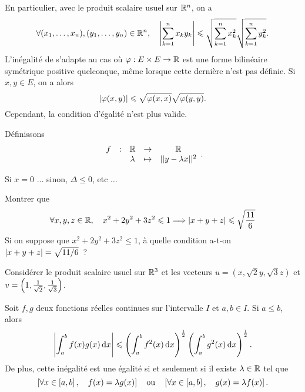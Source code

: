 \documentclass{magnolia}
\begin{document}
\begin{remarques}
\remarque En particulier, avec le produit scalaire usuel sur $\mathbb{R}^n$, on a
  \[\forall (x_1,\ldots,x_n),(y_1,\ldots,y_n)\in\mathbb{R}^n,\quad
    \left|\sum_{k=1}^n x_k y_k\right| \leqslant \sqrt{\sum_{k=1}^n x_k^2}\sqrt{\sum_{k=1}^n y_k^2}.\]
\remarque L'inégalité de  s'adapte au cas où $\varphi:E\times E\to\mathbb{R}$
  est une forme bilinéaire symétrique positive quelconque, même lorsque cette
  dernière n'est pas définie. Si $x,y\in E$, on a alors
  \[\left|\varphi(x,y)\right|\leqslant\sqrt{\varphi(x,x)}\sqrt{\varphi(y,y)}.\]
  Cependant, la condition d'égalité n'est plus valide.
\end{remarques}


\begin{preuve}
Définissons $$\begin{array}{ccccc}
f & : & \mathbb{R} & \to & \mathbb{R} \\
 & & \lambda & \mapsto & ||y-\lambda x||^2 
\end{array}.$$

Si $x=0$ $\ldots$ sinon, $\Delta\le 0$, etc $\ldots$
\end{preuve}

\begin{exoUnique}
\exo Montrer que
  \[\forall x,y,z\in\mathbb{R} ,\quad x^2+2y^2+3z^2\leqslant 1 \Longrightarrow
    \left|x+y+z\right|\leqslant\sqrt{\frac{11}{6}}\]
  Si on suppose que $x^2+2y^2+3z^2\leq 1$, à quelle condition a-t-on
  $\left|x+y+z\right|=\sqrt{11/6}$~?
  \begin{sol}
  Considérer le produit scalaire usuel sur $\mathbb{R}^3$ et les vecteurs
  $u=(x,\sqrt{2}y,\sqrt{3}z)$ et $v=\left(1,\frac{1}{\sqrt{2}},\frac{1}{\sqrt{3}}\right)$.
  \end{sol}
\end{exoUnique}

\begin{proposition}[utile=3, nom=Inégalité de \nom{Cauchy-Schwarz}]
Soit $f,g$ deux fonctions réelles continues sur l'intervalle $I$
et $a,b\in I$. Si $a\leq b$, alors
\[\left|\int_{a}^{b} f(x)g(x)\,\text{d}x\right|\leqslant
  \left(\int_{a}^{b} f^2(x)\,\text{d}x\right)^{\frac{1}{2}}
  \left(\int_{a}^{b} g^2(x)\,\text{d}x\right)^{\frac{1}{2}}.\]
De plus, cette inégalité est une égalité si et seulement si il existe
$\lambda\in\mathbb{R}$ tel que
\[\left[\forall x\in\left[a,b\right] ,\quad f(x)=\lambda g(x)\right]
  \quad\text{ou}\quad
  \left[\forall x\in\left[a,b\right] ,\quad g(x)=\lambda f(x)\right].\]
\end{proposition}
\end{document}
